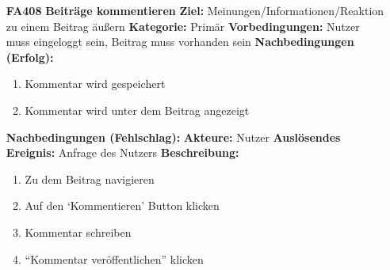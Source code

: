 \documentclass[parskip=full]{scrartcl}
\begin{document}
\begin{itemize}[nosep]
				
			\item[\textbf{FA408}]\textbf{Beiträge kommentieren}
				\newline \textbf{Ziel:} Meinungen/Informationen/Reaktion zu einem Beitrag äußern
				\newline \textbf{Kategorie:} Primär
				\newline \textbf{Vorbedingungen:} Nutzer muss eingeloggt sein, Beitrag muss vorhanden sein
				\newline \textbf{Nachbedingungen (Erfolg):} 
				\begin{enumerate}[nosep]
					\item Kommentar wird gespeichert
					\item Kommentar wird unter dem Beitrag angezeigt 
				\end{enumerate}
				\textbf{Nachbedingungen (Fehlschlag):}
				\newline \textbf{Akteure:} Nutzer
				\newline \textbf{Auslösendes Ereignis:} Anfrage des Nutzers
				\newline \textbf{Beschreibung:}
				\begin{enumerate}[nosep]
					\item Zu dem Beitrag navigieren
					\item Auf den ‘Kommentieren’ Button klicken
					\item Kommentar schreiben
					\item “Kommentar veröffentlichen” klicken\\
				\end{enumerate}
			

\end{itemize}
\end{document}
